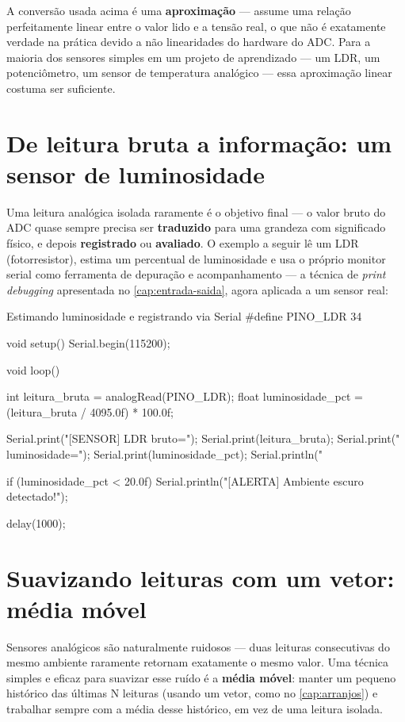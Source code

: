 \begin{atencao}
A conversão  usada acima é uma \textbf{aproximação} — assume uma relação perfeitamente linear entre o valor lido e a tensão real, o que não é exatamente verdade na prática devido a não linearidades do hardware do ADC. Para a maioria dos sensores simples em um projeto de aprendizado — um LDR, um potenciômetro, um sensor de temperatura analógico — essa aproximação linear costuma ser suficiente.
\end{atencao}

\section{De leitura bruta a informação: um sensor de luminosidade}

Uma leitura analógica isolada raramente é o objetivo final — o valor bruto do ADC quase sempre precisa ser \textbf{traduzido} para uma grandeza com significado físico, e depois \textbf{registrado} ou \textbf{avaliado}. O exemplo a seguir lê um LDR (fotorresistor), estima um percentual de luminosidade e usa o próprio monitor serial como ferramenta de depuração e acompanhamento — a técnica de \emph{print debugging} apresentada no \cref{cap:entrada-saida}, agora aplicada a um sensor real:

\begin{codigoc}{Estimando luminosidade e registrando via Serial}
#define PINO_LDR 34

void setup() {
    Serial.begin(115200);
}

void loop() {
    int leitura_bruta = analogRead(PINO_LDR);
    float luminosidade_pct = (leitura_bruta / 4095.0f) * 100.0f;

    Serial.print("[SENSOR] LDR bruto=");
    Serial.print(leitura_bruta);
    Serial.print(" luminosidade=");
    Serial.print(luminosidade_pct);
    Serial.println("%

    if (luminosidade_pct < 20.0f) {
        Serial.println("[ALERTA] Ambiente escuro detectado!");
    }

    delay(1000);
}
\end{codigoc}

\section{Suavizando leituras com um vetor: média móvel}

Sensores analógicos são naturalmente ruidosos — duas leituras consecutivas do mesmo ambiente raramente retornam exatamente o mesmo valor. Uma técnica simples e eficaz para suavizar esse ruído é a \textbf{média móvel}: manter um pequeno histórico das últimas N leituras (usando um vetor, como no \cref{cap:arranjos}) e trabalhar sempre com a média desse histórico, em vez de uma leitura isolada.

